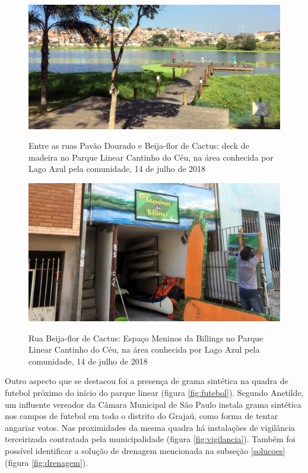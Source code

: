 	\begin{figure}[p]
		\centering
		\caption[Deck de madeira em 14/07/2018]{Entre as ruas Pavão Dourado e Beija-flor de Cactus: deck de madeira no Parque Linear Cantinho do Céu, na área conhecida por Lago Azul pela comunidade, 14 de julho de 2018}
		\includegraphics[width=\linewidth]{img/visita_pier}
		\label{fig:pier}
	\end{figure}
	
	\begin{figure}[p]
		\centering
		\caption[Espaço Meninos da Billings em 14/07/2018]{Rua Beija-flor de Cactus: Espaço Meninos da Billings no Parque Linear Cantinho do Céu, na área conhecida por Lago Azul pela comunidade, 14 de julho de 2018}
		\includegraphics[width=\linewidth]{img/visita_meninos}
		\label{fig:meninos_remada}
	\end{figure}
	
	Outro aspecto que se destacou foi a presença de grama sintética na quadra de futebol próximo do início do parque linear (figura \ref{fig:futebol}). Segundo Anetilde, um influente vereador da Câmara Municipal de São Paulo instala grama sintética nos campos de futebol em todo o distrito do Grajaú, como forma de tentar angariar votos. Nas proximidades da mesma quadra há instalações de vigilância terceirizada contratada pela municipalidade (figura \ref{fig:vigilancia}). Também foi possível identificar a solução de drenagem mencionada na subseção \ref{solucoes} (figura \ref{fig:drenagem}).
		
